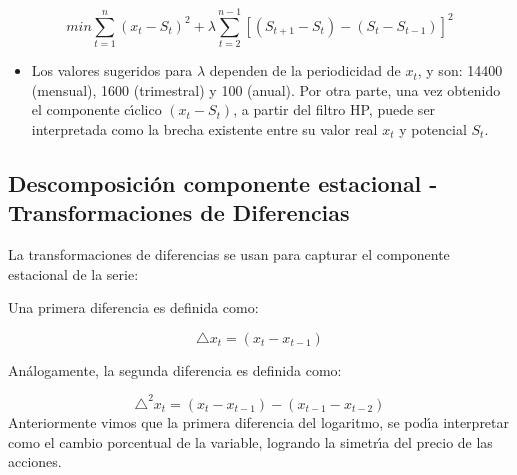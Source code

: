 \begin{equation*}
min \sum_{t=1}^{n} \left(x_t -S_t\right)^2 + \lambda \sum_{t=2}^{n-1} \left[ \left(S_{t+1}-S_t\right)-\left(S_t-S_{t-1}\right)\right]^2
\end{equation*}

\begin{itemize}
	\item Los valores sugeridos para $\lambda$ dependen de la periodicidad de $x_t$, y son: 14400 (mensual), 1600 (trimestral) y 100 (anual). Por otra parte, una vez obtenido el componente c\'\i{}clico $ \left(x_t -S_t\right)$, a partir del filtro HP, puede ser interpretada como la brecha existente entre su valor real $x_t$ y potencial $S_t$.
\end{itemize}

\subsection{Descomposici\'on componente estacional - Transformaciones de Diferencias}

La transformaciones de diferencias se usan para capturar el componente estacional de la serie:

Una primera diferencia es definida como:

\begin{equation*}
\triangle x_t = (x_t - x_{t-1})
\end{equation*}

An\'alogamente, la segunda diferencia es definida como:

\begin{equation*}
\triangle^2x_t = (x_t - x_{t-1})-(x_{t-1} - x_{t-2})
\end{equation*}
Anteriormente vimos que la primera diferencia del logaritmo, se pod\'\i{}a interpretar como el cambio porcentual de la variable, logrando la simetr\'\i{}a del precio de las acciones.


